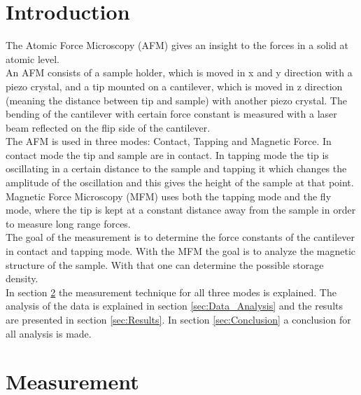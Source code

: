 \documentclass[%
 reprint,
amsmath,amssymb,
pra,
]{revtex4-1}
\begin{document}
\section{Introduction}
The Atomic Force Microscopy (AFM) gives an insight to the forces in a solid at atomic level. \\
An AFM consists of a sample holder, which is moved in x and y direction with a piezo crystal, and a tip mounted on a cantilever, which is moved in z direction (meaning the distance between tip and sample) with another piezo crystal. The bending of the cantilever with certain force constant is measured with a laser beam reflected on the flip side of the cantilever. \\
The AFM is used in three modes: Contact, Tapping and Magnetic Force. In contact mode the tip and sample are in contact. In tapping mode the tip is oscillating in a certain distance to the sample and tapping it which changes the amplitude of the oscillation and this gives the height of the sample at that point. Magnetic Force Microscopy (MFM) uses both the tapping mode and the fly mode, where the tip is kept at a constant distance away from the sample in order to measure long range forces. \\
The goal of the measurement is to determine the force constants of the cantilever in contact and tapping mode. With the MFM the goal is to analyze the magnetic structure of the sample. With that one can determine the possible storage density. \\
In section \ref{sec:Measurement} the measurement technique for all three modes is explained. The analysis of the data is explained in section \ref{sec:Data_Analysis} and the results are presented in section \ref{sec:Results}. In section \ref{sec:Conclusion} a conclusion for all analysis is made.


\section{Measurement}
\label{sec:Measurement}
\end{document}
